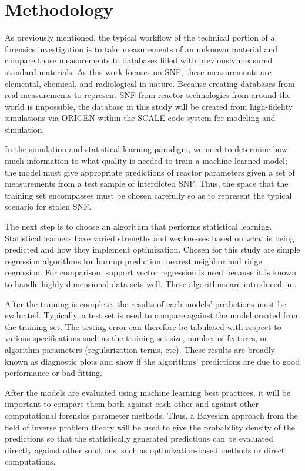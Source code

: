 \section{Methodology}
\label{sec:methodology}

As previously mentioned, the typical workflow of the technical portion of a
forensics investigation is to take measurements of an unknown material and
compare those measurements to databases filled with previously measured
standard materials. As this work focuses on \gls{SNF}, these measurements are
elemental, chemical, and radiological in nature.  Because creating databases
from real measurements to represent \gls{SNF} from reactor technologies from
around the world is impossible, the database in this study will be created from
high-fidelity simulations via \gls{ORIGEN} \cite{origen} within the SCALE code
system \cite{scale} for modeling and simulation. 

In the simulation and statistical learning paradigm, we need to determine how
much information to what quality is needed to train a machine-learned model;
the model must give appropriate predictions of reactor parameters given a set
of measurements from a test sample of interdicted \gls{SNF}. Thus, the space 
that the training set encompasses must be chosen carefully so as to represent 
the typical scenario for stolen \gls{SNF}.

The next step is to choose an algorithm that performs statistical learning.
Statistical learners have varied strengths and weaknesses based on what is
being predicted and how they implement optimization.  Chosen for this study are
simple regression algorithms for burnup prediction: nearest neighbor and ridge
regression.  For comparison, support vector regression is used because it is
known to handle highly dimensional data sets well.  These algorithms are
introduced in \label{sec:algs}.

After the training is complete, the results of each models' predictions must be
evaluated.  Typically, a test set is used to compare against the model created
from the training set.  The testing error can therefore be tabulated with
respect to various specifications such as the training set size, number of
features, or algorithm parameters (regularization terms, etc). These results
are broadly known as diagnostic plots and show if the algorithms' predictions
are due to good performance or bad fitting. 

After the models are evaluated using machine learning best practices, it will
be important to compare them both against each other and against other
computational forensics parameter methods. Thus, a Bayesian approach from the
field of inverse problem theory will be used to give the probability density of
the predictions so that the statistically generated predictions can be
evaluated directly against other solutions, such as optimization-based methods
or direct computations. 

